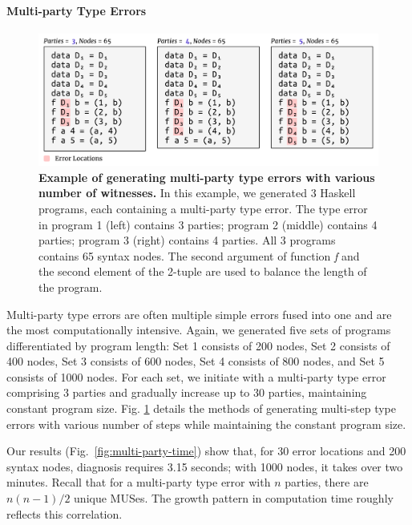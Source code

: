 \documentclass[pdflatex,lineno,sn-nature,Numbered]{sn-jnl}%
\begin{document}
\paragraph{Multi-party Type Errors}

\begin{figure}[ht]
    \centering
    \includegraphics[width=\linewidth]{images/MultiPartyMutation}
    \caption{{\bf Example of generating multi-party type errors with various number of witnesses.} In this example, we generated 3 Haskell programs, each containing a multi-party type error. The type error in program 1 (left) contains 3 parties; program 2 (middle) contains 4 parties; program 3 (right) contains 4 parties. All 3 programs contains 65 syntax nodes. The second argument of function {\it f} and the second element of the 2-tuple are used to balance the length of the program.}
    \label{fig:multi-party-mutation}
\end{figure}

Multi-party type errors are often multiple simple errors fused into one and are the most computationally intensive. Again, we generated five sets of programs differentiated by program length: Set 1 consists of 200 nodes, Set 2 consists of 400 nodes, Set 3 consists of 600 nodes, Set 4 consists of 800 nodes, and Set 5 consists of 1000 nodes. For each set, we initiate with a multi-party type error comprising 3 parties and gradually increase up to 30 parties, maintaining constant program size. Fig. \ref{fig:multi-party-mutation} details the methods of generating multi-step type errors with various number of steps while maintaining the constant program size.

Our results (Fig.~\ref{fig:multi-party-time}) show that, for 30 error locations and 200 syntax nodes, diagnosis requires 3.15 seconds; with 1000 nodes, it takes over two minutes. Recall that for a multi-party type error with $n$ parties, there are $n (n - 1) / 2$ unique MUSes. The growth pattern in computation time roughly reflects this correlation.
\end{document}
